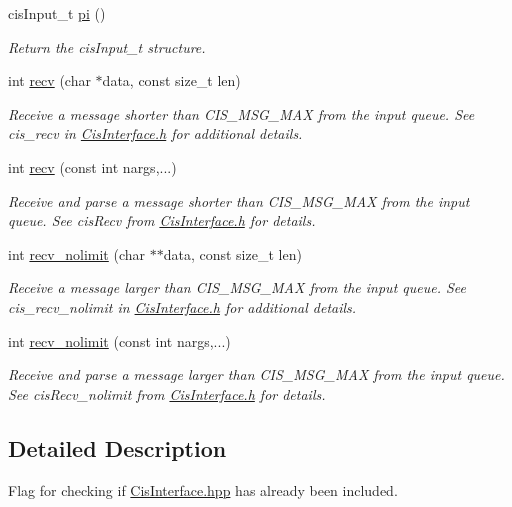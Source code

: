 \begin{DoxyCompactItemize}
cis\+Input\+\_\+t \mbox{\hyperlink{classCisInput_a2b560759fbd797db1dc049e886ce72e5}{pi}} ()
\begin{DoxyCompactList}\small\item\em Return the cis\+Input\+\_\+t structure. \end{DoxyCompactList}\item 
int \mbox{\hyperlink{classCisInput_aa05f26dd9d8db09e12da739831637a2a}{recv}} (char $\ast$data, const size\+\_\+t len)
\begin{DoxyCompactList}\small\item\em Receive a message shorter than C\+I\+S\+\_\+\+M\+S\+G\+\_\+\+M\+AX from the input queue. See cis\+\_\+recv in \mbox{\hyperlink{CisInterface_8h_source}{Cis\+Interface.\+h}} for additional details. \end{DoxyCompactList}\item 
int \mbox{\hyperlink{classCisInput_a387134ab4f750a06654946d4b92d412d}{recv}} (const int nargs,...)
\begin{DoxyCompactList}\small\item\em Receive and parse a message shorter than C\+I\+S\+\_\+\+M\+S\+G\+\_\+\+M\+AX from the input queue. See cis\+Recv from \mbox{\hyperlink{CisInterface_8h_source}{Cis\+Interface.\+h}} for details. \end{DoxyCompactList}\item 
int \mbox{\hyperlink{classCisInput_a962f5ebcac9d8b70fe3cd907da6dd3a9}{recv\+\_\+nolimit}} (char $\ast$$\ast$data, const size\+\_\+t len)
\begin{DoxyCompactList}\small\item\em Receive a message larger than C\+I\+S\+\_\+\+M\+S\+G\+\_\+\+M\+AX from the input queue. See cis\+\_\+recv\+\_\+nolimit in \mbox{\hyperlink{CisInterface_8h_source}{Cis\+Interface.\+h}} for additional details. \end{DoxyCompactList}\item 
int \mbox{\hyperlink{classCisInput_aa78610915e128dc1ed0d234271d2d656}{recv\+\_\+nolimit}} (const int nargs,...)
\begin{DoxyCompactList}\small\item\em Receive and parse a message larger than C\+I\+S\+\_\+\+M\+S\+G\+\_\+\+M\+AX from the input queue. See cis\+Recv\+\_\+nolimit from \mbox{\hyperlink{CisInterface_8h_source}{Cis\+Interface.\+h}} for details. \end{DoxyCompactList}\end{DoxyCompactItemize}


\subsection{Detailed Description}
Flag for checking if \mbox{\hyperlink{CisInterface_8hpp_source}{Cis\+Interface.\+hpp}} has already been included. 

